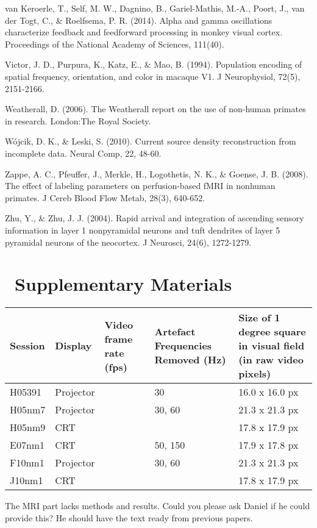 \documentclass{article}
\begin{document}
van Keroerle, T., Self, M. W., Dagnino, B., Gariel-Mathis, M.-A., Poort, J., van der Togt, C., \& Roelfsema, P. R. (2014). Alpha and gamma oscillations characterize feedback and feedforward processing in monkey visual cortex. Proceedings of the National Academy of Sciences, 111(40).

Victor, J. D., Purpura, K., Katz, E., \& Mao, B. (1994). Population encoding of spatial frequency, orientation, and color in macaque V1. J Neurophysiol, 72(5), 2151-2166.

Weatherall, D. (2006). The Weatherall report on the use of non-human primates in research. London:The Royal Society.

W\'ojcik, D. K., \& Leski, S. (2010). Current source density reconstruction from incomplete data. Neural Comp, 22, 48-60.

Zappe, A. C., Pfeuffer, J., Merkle, H., Logothetis, N. K., \& Goense, J. B. (2008). The effect of labeling parameters on perfusion-based fMRI in nonhuman primates. J Cereb Blood Flow Metab, 28(3), 640-652.

Zhu, Y., \& Zhu, J. J. (2004). Rapid arrival and integration of ascending sensory information in layer 1 nonpyramidal neurons and tuft dendrites of layer 5 pyramidal neurons of the neocortex. J Neurosci, 24(6), 1272-1279.

\section[\ Supplementary Materials]{\ Supplementary Materials}

\bigskip

\begin{flushleft}
\tablefirsthead{}
\tablehead{}
\tabletail{}
\tablelasttail{}
\begin{supertabular}{m{1.6789999cm}|m{1.888cm}|m{2.3009999cm}|m{3.5479999cm}|m{5.303cm}}
Session &
Display &
Video frame rate (fps) &
Artefact Frequencies Removed (Hz) &
Size of 1 degree square in visual field (in raw video pixels)\\\hline
H05391 &
Projector &
 &
30 &
16.0 x 16.0 px\\
H05nm7 &
Projector &
 &
30, 60 &
21.3 x 21.3 px\\
H05nm9 &
CRT &
 &
~
 &
17.8 x 17.9 px\\
E07nm1 &
CRT &
 &
50, 150 &
17.9 x 17.8 px\\
F10nm1 &
Projector &
 &
30, 60 &
21.3 x 21.3 px\\
J10nm1 &
CRT &
 &
~
 &
17.8 x 17.9 px\\
\end{supertabular}
\end{flushleft}

\bigskip

The MRI part lacks methods and results. Could you please ask Daniel if he could provide this? He should have the text ready from previous papers.
\end{document}

